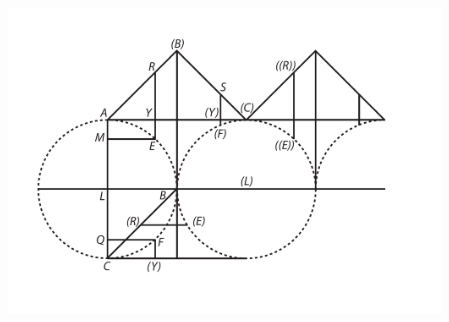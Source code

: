 \pend 
\begin{center}                   
\noindent \includegraphics[width=0.86\textwidth]{images/lh0351009_004r-d3.pdf}
\end{center}
\count{}
